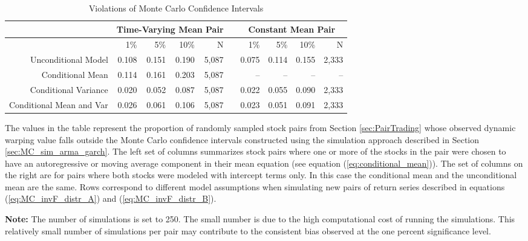 \documentclass[12pt]{report}
\begin{document}
\begin{table}[!ht]
    \caption{Violations of Monte Carlo Confidence Intervals}
    \fontsize{11pt}{11pt}\selectfont
    \centering
    \begin{tabular}{r r r r r r r r r r}
        \midrule
         & \multicolumn{4}{c}{Time-Varying Mean Pair} & & \multicolumn{4}{c}{Constant Mean Pair}    \\
        \midrule
                                 & 1\%   & 5\%   & 10\%  & N     & & 1\%   & 5\%   & 10\%  & N     \\
        Unconditional Model      & 0.108 & 0.151 & 0.190 & 5,087 & & 0.075 & 0.114 & 0.155 & 2,333 \\
        Conditional Mean         & 0.114 & 0.161 & 0.203 & 5,087 & &    -- &    -- &    -- &   --  \\
        Conditional Variance     & 0.020 & 0.052 & 0.087 & 5,087 & & 0.022 & 0.055 & 0.090 & 2,333 \\
        Conditional Mean and Var & 0.026 & 0.061 & 0.106 & 5,087 & & 0.023 & 0.051 & 0.091 & 2,333 \\
        \cmidrule{1-10}
    \end{tabular}
    \begin{tablenotes}
        \item{The values in the table represent the proportion of randomly sampled stock pairs from Section \ref{sec:PairTrading} whose observed dynamic warping value falls outside the Monte Carlo confidence intervals constructed using the simulation approach described in Section \ref{sec:MC_sim_arma_garch}. The left set of columns summarizes stock pairs where one or more of the stocks in the pair were chosen to have an autoregressive or moving average component in their mean equation (see equation (\ref{eq:conditional_mean})). The set of columns on the right are for pairs where both stocks were modeled with intercept terms only. In this case the conditional mean and the unconditional mean are the same. Rows correspond to different model assumptions when simulating new pairs of return series described in equations (\ref{eq:MC_invF_distr_A}) and (\ref{eq:MC_invF_distr_B}).}
        \item \textbf{Note:} The number of simulations is set to 250. The small number is due to the high computational cost of running the simulations. This relatively small number of simulations per pair may contribute to the consistent bias observed at the one percent significance level.
    \end{tablenotes}
    \label{tbl:monte_carlo_confidence_intervals}
\end{table}
\end{document}
